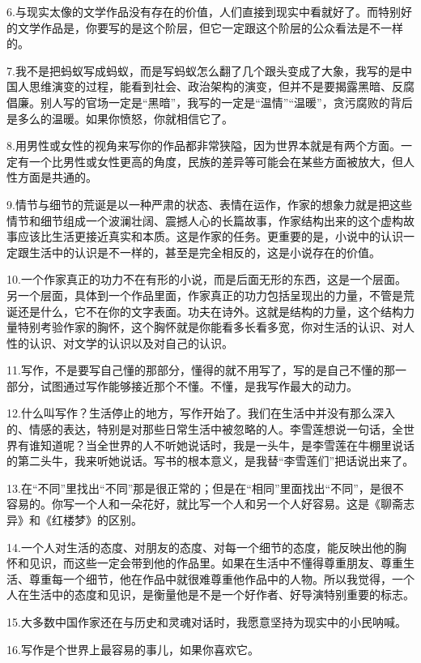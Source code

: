\documentclass[fontset=fandol,12pt,a5paper]{ctexbook}
\begin{document}
6.与现实太像的文学作品没有存在的价值，人们直接到现实中看就好了。而特别好的文学作品是，你要写的是这个阶层，但它一定跟这个阶层的公众看法是不一样的。

7.我不是把蚂蚁写成蚂蚁，而是写蚂蚁怎么翻了几个跟头变成了大象，我写的是中国人思维演变的过程，能看到社会、政治架构的演变，但并不是要揭露黑暗、反腐倡廉。别人写的官场一定是“黑暗”，我写的一定是“温情”“温暖”，贪污腐败的背后是多么的温暖。如果你愤怒，你就相信它了。

8.用男性或女性的视角来写你的作品都非常狭隘，因为世界本就是有两个方面。一定有一个比男性或女性更高的角度，民族的差异等可能会在某些方面被放大，但人性方面是共通的。

9.情节与细节的荒诞是以一种严肃的状态、表情在运作，作家的想象力就是把这些情节和细节组成一个波澜壮阔、震撼人心的长篇故事，作家结构出来的这个虚构故事应该比生活更接近真实和本质。这是作家的任务。更重要的是，小说中的认识一定跟生活中的认识是不一样的，甚至是完全相反的，这是小说存在的价值。

10.一个作家真正的功力不在有形的小说，而是后面无形的东西，这是一个层面。另一个层面，具体到一个作品里面，作家真正的功力包括呈现出的力量，不管是荒诞还是什么，它不在你的文字表面。功夫在诗外。这就是结构的力量，这个结构力量特别考验作家的胸怀，这个胸怀就是你能看多长看多宽，你对生活的认识、对人性的认识、对文学的认识以及对自己的认识。

11.写作，不是要写自己懂的那部分，懂得的就不用写了，写的是自己不懂的那一部分，试图通过写作能够接近那个不懂。不懂，是我写作最大的动力。

12.什么叫写作？生活停止的地方，写作开始了。我们在生活中并没有那么深入的、情感的表达，特别是对那些日常生活中被忽略的人。李雪莲想说一句话，全世界有谁知道呢？当全世界的人不听她说话时，我是一头牛，是李雪莲在牛棚里说话的第二头牛，我来听她说话。写书的根本意义，是我替“李雪莲们”把话说出来了。

13.在“不同”里找出“不同”那是很正常的；但是在“相同”里面找出“不同”，是很不容易的。你写一个人和一朵花好，就比写一个人和另一个人好容易。这是《聊斋志异》和《红楼梦》的区别。

14.一个人对生活的态度、对朋友的态度、对每一个细节的态度，能反映出他的胸怀和见识，而这些一定会带到他的作品里。如果在生活中不懂得尊重朋友、尊重生活、尊重每一个细节，他在作品中就很难尊重他作品中的人物。所以我觉得，一个人在生活中的态度和见识，是衡量他是不是一个好作者、好导演特别重要的标志。

15.大多数中国作家还在与历史和灵魂对话时，我愿意坚持为现实中的小民呐喊。

16.写作是个世界上最容易的事儿，如果你喜欢它。
\end{document}
